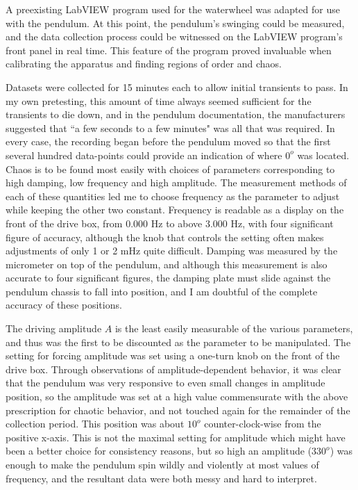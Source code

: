 \documentclass[12pt,twoside]{reedthesis}
\begin{document}
A preexisting LabVIEW program used for the waterwheel was adapted for use with the pendulum.  At this point, the pendulum's swinging could be measured, and the data collection process could be witnessed on the LabVIEW program's front panel in real time.  This feature of the program proved invaluable when calibrating the apparatus and finding regions of order and chaos.  

Datasets were collected for 15 minutes each to allow initial transients to pass.  In my own pretesting, this amount of time always seemed sufficient for the transients to die down, and in the pendulum documentation, the manufacturers suggested that ``a few seconds to a few minutes" was all that was required.  In every case, the recording began before the pendulum moved so that the first several hundred data-points could provide an indication of where $0^o$ was located.  Chaos is to be found most easily with choices of parameters corresponding to high damping, low frequency and high amplitude.  The measurement methods of each of these quantities led me to choose frequency as the parameter to adjust while keeping the other two constant.  Frequency is readable as a display on the front of the drive box, from 0.000 Hz to above 3.000 Hz, with four significant figure of accuracy, although the knob that controls the setting often makes adjustments of only 1 or 2 mHz quite difficult.  Damping was measured by the micrometer on top of the pendulum, and although this measurement is also accurate to four significant figures, the damping plate must slide against the pendulum chassis to fall into position, and I am doubtful of the complete accuracy of these positions.  

The driving amplitude $A$ is the least easily measurable of the various parameters, and thus was the first to be discounted as the parameter to be manipulated.  The setting for forcing amplitude was set using a one-turn knob on the front of the drive box.  Through observations of amplitude-dependent behavior, it was clear that the pendulum was very responsive to even small changes in amplitude position, so the amplitude was set at a high value commensurate with the above prescription for chaotic behavior, and not touched again for the remainder of the collection period.  This position was about $10^o$ counter-clock-wise from the positive x-axis.  This is not the maximal setting for amplitude which might have been a better choice for consistency reasons, but so high an amplitude ($330^o$) was enough to make the pendulum spin wildly and violently at most values of frequency, and the resultant data were both messy and hard to interpret.  
\end{document}
